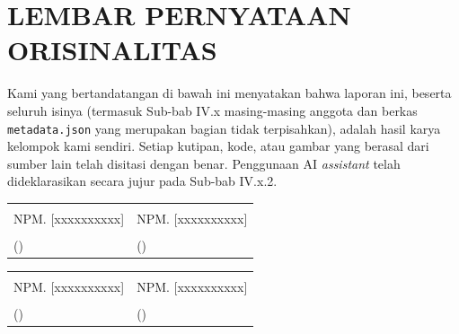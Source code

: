 \documentclass[11pt,a4paper,oneside]{report}
\begin{document}
\chapter*{LEMBAR PERNYATAAN ORISINALITAS}

Kami yang bertandatangan di bawah ini menyatakan bahwa laporan ini, beserta seluruh isinya (termasuk Sub-bab IV.x masing-masing anggota dan berkas \texttt{metadata.json} yang merupakan bagian tidak terpisahkan), adalah hasil karya kelompok kami sendiri. Setiap kutipan, kode, atau gambar yang berasal dari sumber lain telah disitasi dengan benar. Penggunaan AI \textit{assistant} telah dideklarasikan secara jujur pada Sub-bab IV.x.2.

\vspace{1.5cm}

\noindent
\begin{tabular}{p{}p{}}
 &  \tabularnewline
\centering NPM. [xxxxxxxxxx] & \centering NPM. [xxxxxxxxxx] \tabularnewline
\vspace{1.5cm} & \vspace{1.5cm} \tabularnewline
\centering (\hspace{4cm}) & \centering (\hspace{4cm}) \tabularnewline
\end{tabular}

\vspace{1cm}

\noindent
\begin{tabular}{p{}p{}}
 &  \tabularnewline
\centering NPM. [xxxxxxxxxx] & \centering NPM. [xxxxxxxxxx] \tabularnewline
\vspace{1.5cm} & \vspace{1.5cm} \tabularnewline
\centering (\hspace{4cm}) & \centering (\hspace{4cm}) \tabularnewline
\end{tabular}

\tableofcontents
\listoffigures
\listoftables
\end{document}
